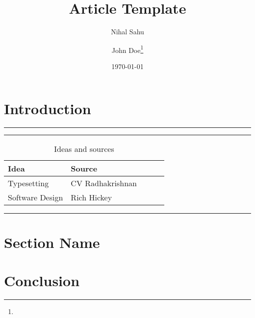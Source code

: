 \documentclass[12pt]{article}
\title{Article Template}
\author{Nihal Sahu \and John Doe\thanks{\lipsum[4]}}
\date{\today}
\begin{document}
\maketitle
\begin{abstract}
    \lipsum[5]
\end{abstract}
\newpage
\tableofcontents
\newpage

\section{Introduction}
\lipsum

\begin{table}[htbp]
\hrule height 1pt\medskip
\caption{Ideas and sources}
\hrule
\medskip
\small \lipsum[4]
\vspace{2mm}
\begin{center}
    \begin{tabular}{ l l l l l }
    \midrule
    Idea & Source \\\midrule
    Typesetting & CV Radhakrishnan \\
    Software Design & Rich Hickey \\
    \end{tabular}
\end{center}
\medskip
\hrule
\end{table}

\section{Section Name}
\lipsum
\section{Conclusion}
\lipsum
\end{document}
